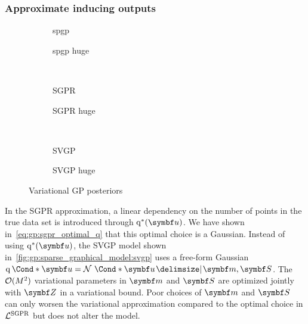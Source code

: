 \subsubsection{Approximate inducing outputs}
\begin{figure}[p]
    \begin{subfigure}[b]{\halffigurewidth}
        \centering
        \caption{
            spgp
            \label{fig:gp:variational:spgp}
        }
    \end{subfigure}
    \hfill
    \begin{subfigure}[b]{\halffigurewidth}
        \centering
        \caption{
            spgp huge
            \label{fig:gp:variational:spgp_huge}
        }
    \end{subfigure}\\[\figureskip]
    \begin{subfigure}[b]{\halffigurewidth}
        \centering
        \caption{
            SGPR
            \label{fig:gp:variational:sgpr}
        }
    \end{subfigure}
    \hfill
    \begin{subfigure}[b]{\halffigurewidth}
        \centering
        \caption{
            SGPR huge
            \label{fig:gp:variational:sgpr_huge}
        }
    \end{subfigure}\\[\figureskip]
    \begin{subfigure}[b]{\halffigurewidth}
        \centering
        \caption{
            SVGP
            \label{fig:gp:variational:svgp}
        }
    \end{subfigure}
    \hfill
    \begin{subfigure}[b]{\halffigurewidth}
        \centering
        \caption{
            SVGP huge
            \label{fig:gp:variational:svgp_huge}
        }
    \end{subfigure}
    \caption[Variational GP posteriors]{
        Variational GP posteriors
        \label{fig:gp:variational}
    }
\end{figure}
In the SGPR approximation, a linear dependency on the number of points in the true data set is introduced through $\q^\ast(\mat{u})$.
We have shown in~\cref{eq:gp:sgpr_optimal_q} that this optimal choice is a Gaussian.
Instead of using $\q^\ast(\mat{u})$, the SVGP model shown in~\cref{fig:gp:sparse_graphical_model:svgp} uses a free-form Gaussian $\Variat*{\mat{u}} = \Gaussian*{\mat{u} \given \mat{m}, \mat{S}}$.
The $\operatorname{\mathcal{O}}(M^2)$ variational parameters in $\mat{m}$ and $\mat{S}$ are optimized jointly with $\mat{Z}$ in a variational bound.
Poor choices of $\mat{m}$ and $\mat{S}$ can only worsen the variational approximation compared to the optimal choice in $\mathcal{L}^{\text{SGPR}}$ but does not alter the model.

